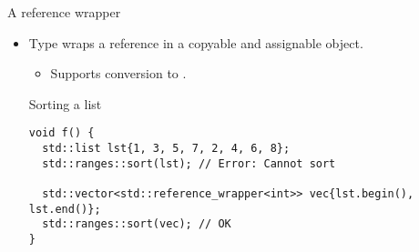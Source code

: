 \begin{frame}[t,fragile]{A reference wrapper}
\begin{itemize}
  \item Type  wraps a reference in a copyable and assignable object.
    \begin{itemize}
      \item Supports conversion to .
    \end{itemize}

\begin{block}{Sorting a list}
\begin{lstlisting}
void f() {
  std::list lst{1, 3, 5, 7, 2, 4, 6, 8};
  std::ranges::sort(lst); // Error: Cannot sort

  std::vector<std::reference_wrapper<int>> vec{lst.begin(), lst.end()};
  std::ranges::sort(vec); // OK 
}
\end{lstlisting}
\end{block}
\end{itemize}
\end{frame}
